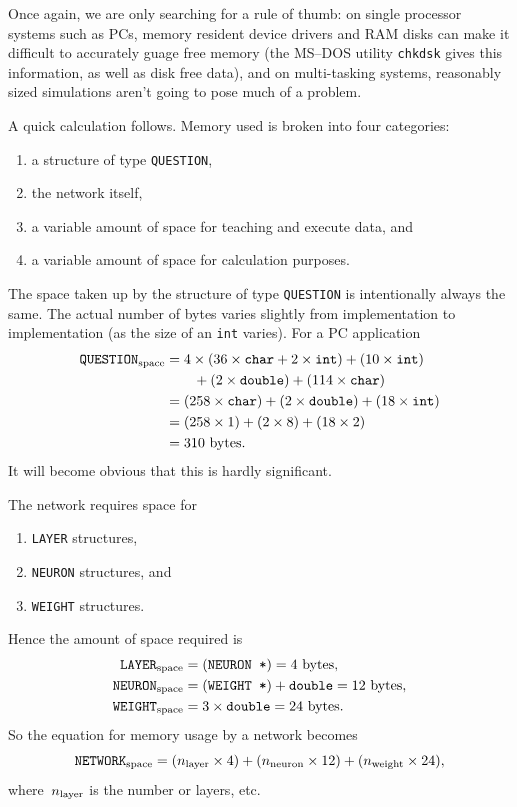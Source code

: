 \documentclass[12pt]{report}
\begin{document}
Once again, we are only searching for a rule of thumb: on single
processor systems such as PCs, memory resident device drivers and
RAM disks can make it difficult to accurately guage free memory
(the MS--DOS utility \texttt{chkdsk} gives this information, as well as
disk free data), and on
multi-tasking systems, reasonably sized simulations aren't going to
pose much of a problem.

A quick calculation follows.
Memory used is broken into four categories:
\begin{enumerate}
\item a structure of type \texttt{QUESTION},
\item the network itself,
\item a variable amount of space for teaching and execute data, and
\item a variable amount of space for calculation purposes.
\end{enumerate}

The space taken up by the structure of type \texttt{QUESTION} is
intentionally always the same.
The actual number of bytes varies slightly from implementation to
implementation (as the size of an \texttt{int} varies).
For a PC application
$$
\begin{aligned}
\texttt{QUESTION}_{\rm space} &= 4 \times ( 36 \times \texttt{char} +
	2 \times \texttt{int}) + (10 \times \texttt{int}) \\
		&\qquad + (2 \times \texttt{double}) +
			(114 \times \texttt{char})\\
		&= (258 \times \texttt{char}) + (2 \times \texttt{double}) +
			(18 \times \texttt{int})\\
		&= (258 \times 1) + (2 \times 8) + (18 \times 2)\\
		&= 310 {\rm\  bytes}.
\end{aligned}
$$
It will become obvious that this is hardly significant.

The network requires space for
\begin{enumerate}
\item \texttt{LAYER} structures,
\item \texttt{NEURON} structures, and
\item \texttt{WEIGHT} structures.
\end{enumerate}

Hence the amount of space required is
$$
\begin{aligned}
\texttt{LAYER}_{\rm space} &= (\texttt{NEURON *}) = 4 {\rm\ bytes},\\
\texttt{NEURON}_{\rm space}&= (\texttt{WEIGHT *}) + \texttt{double} 
			= 12 {\rm \ bytes}, \\
\texttt{WEIGHT}_{\rm space}&= 3 \times \texttt{double} = 24 {\rm \ bytes}.\\
\end{aligned}
$$
So the equation for memory usage by a network becomes
$$
\texttt{NETWORK}_{\rm space} = (n_{\rm layer} \times 4) + 
	(n_{\rm neuron} \times 12) + (n_{\rm weight} \times 24),
$$
where~$n_{\rm layer}$ is the number or layers, etc.
\end{document}
